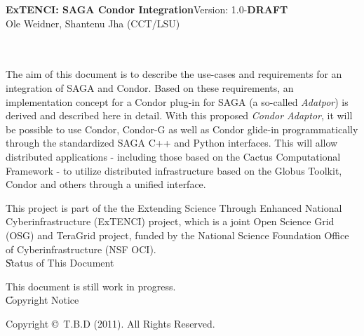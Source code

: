
\newcommand{\sagadocument}{ExTENCI: SAGA Condor Integration}
\newcommand{\sagaversion}{1.0-\textbf{DRAFT}}
\newcommand{\sagabasename}{saga-programming-guide}
\newcommand{\sagaemail}{\{oweidner|sjha\} @ cct.lsu.edu}



\newcommand{\name}{\F{SAGA}\xspace}
\DefineShortVerb{\|}



 \thispagestyle{empty}

  \textbf{\sagadocument}\hfill  Version: \sagaversion\\
  Ole Weidner, Shantenu Jha (CCT/LSU) \hfill {\sagadate} 

  \hrulefill\\[2em]

  \\[4em]

   The aim of this document is to describe the use-cases and
   requirements for an integration of SAGA and Condor. Based on these
   requirements, an implementation concept for a Condor plug-in for SAGA
   (a so-called \textit{Adatpor}) is  derived and described here in
   detail. With this proposed \textit{Condor Adaptor}, it will be
   possible to use Condor, Condor-G as well as Condor glide-in
   programmatically through the standardized SAGA C++ and Python
   interfaces. This will allow distributed applications - including
   those based on the Cactus Computational Framework - to utilize
   distributed infrastructure based on the Globus Toolkit, Condor and
   others through a unified interface.

   This project is part of the the Extending Science Through Enhanced
   National Cyberinfrastructure (ExTENCI) project, which is a joint Open
   Science Grid (OSG) and TeraGrid project, funded by the National
   Science Foundation Office of Cyberinfrastructure (NSF OCI). \\[2em]


  \U{Status of This Document}

  This document is still work in progress.\\
  
    \U{Copyright Notice}

  Copyright \copyright~T.B.D (2011).  All Rights
  Reserved.\\

  \newpage

  \tableofcontents

  \newpage

